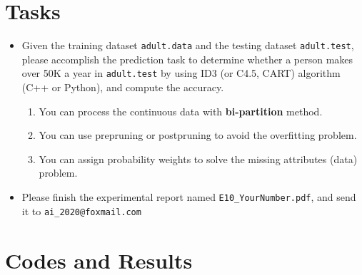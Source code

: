 \documentclass[a4paper, 11pt]{article}
\begin{document}
\section{Tasks}
\begin{itemize}
\item Given the training dataset \texttt{adult.data} and the testing dataset \texttt{adult.test}, please accomplish the prediction task to determine whether a person makes over 50K a year in \texttt{adult.test} by using ID3 (or C4.5, CART) algorithm (C++ or Python), and compute the accuracy. 
\begin{enumerate}
\item You can process the continuous data with \textbf{bi-partition} method.
\item You can use prepruning or postpruning to avoid the overfitting problem.
\item You can assign probability weights to solve the missing attributes (data) problem.
\end{enumerate}

\item Please finish the experimental report named \texttt{E10\_YourNumber.pdf}, and send it to \texttt{ai\_2020@foxmail.com}
\end{itemize}

\section{Codes and Results}
\end{document}
